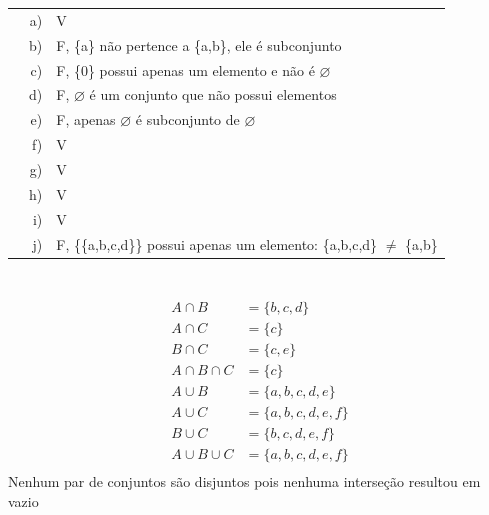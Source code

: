 \documentclass[12pt]{article}
\begin{document}
\section{}
	\begin{tabular}{rrl}
		\quad\qquad & a) & V \\
		\quad\qquad & b) & F, \{a\} não pertence a \{a,b\}, ele é subconjunto \\
		\quad\qquad & c) & F, \{0\} possui apenas um elemento e não é $\varnothing$ \\
		\quad\qquad & d) & F, $\varnothing$ é um conjunto que não possui elementos \\
		\quad\qquad & e) & F, apenas $\varnothing$ é subconjunto de $\varnothing$ \\
		\quad\qquad & f) & V \\
		\quad\qquad & g) & V \\
		\quad\qquad & h) & V \\
		\quad\qquad & i) & V \\
		\quad\qquad & j) & F, \{\{a,b,c,d\}\} possui apenas um elemento: \{a,b,c,d\} $\neq$ \{a,b\} \\
	\end{tabular}

\section{}
	\begin{align*}
		A \cap B        &= \{b,c,d\} \\
		A \cap C        &= \{c\} \\
		B \cap C        &= \{c,e\} \\
		A \cap B \cap C &= \{c\} \\
		A \cup B        &= \{a,b,c,d,e\} \\
		A \cup C        &= \{a,b,c,d,e,f\} \\
		B \cup C        &= \{b,c,d,e,f\} \\
		A \cup B \cup C &= \{a,b,c,d,e,f\} \\
	\end{align*}
	Nenhum par de conjuntos são disjuntos pois nenhuma interseção resultou em vazio
\end{document}
